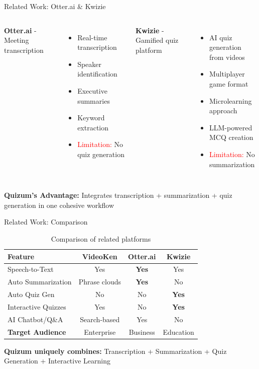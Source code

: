 \documentclass{beamer}
\begin{document}
\begin{frame}{Related Work: Otter.ai \& Kwizie}
    \begin{columns}
        \textbf{Otter.ai} - Meeting transcription
        \begin{itemize}
            \item Real-time transcription
            \item Speaker identification
            \item Executive summaries
            \item Keyword extraction
            \item \textcolor{red}{Limitation:} No quiz generation
        \end{itemize}
        
        \textbf{Kwizie} - Gamified quiz platform
        \begin{itemize}
            \item AI quiz generation from videos
            \item Multiplayer game format
            \item Microlearning approach
            \item LLM-powered MCQ creation
            \item \textcolor{red}{Limitation:} No summarization
        \end{itemize}
    \end{columns}
    
    \vspace{0.3cm}
    \textbf{Quizum's Advantage:} Integrates transcription + summarization + quiz generation in one cohesive workflow
\end{frame}

\begin{frame}{Related Work: Comparison}
    \begin{table}
        \centering
        \small
        \begin{tabular}{lccc}
            \toprule
            \textbf{Feature} & \textbf{VideoKen} & \textbf{Otter.ai} & \textbf{Kwizie} \\
            \midrule
            Speech-to-Text & Yes & \textbf{Yes} & Yes \\
            Auto Summarization & Phrase clouds & \textbf{Yes} & No \\
            Auto Quiz Gen & No & No & \textbf{Yes} \\
            Interactive Quizzes & Yes & No & \textbf{Yes} \\
            AI Chatbot/Q\&A & Search-based & Yes & No \\
            \midrule
            \textbf{Target Audience} & Enterprise & Business & Education \\
            \bottomrule
        \end{tabular}
        \caption{Comparison of related platforms}
    \end{table}
    
    \vspace{0.2cm}
    \textbf{Quizum uniquely combines:} Transcription + Summarization + Quiz Generation + Interactive Learning
\end{frame}
\end{document}
